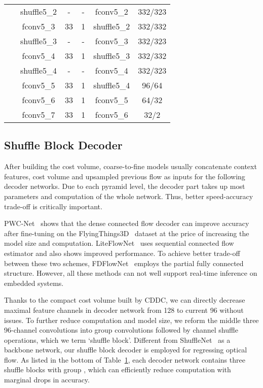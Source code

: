\documentclass[letterpaper, 10 pt, conference]{ieeeconf}
\begin{document}
\begin{table}[t]
{\begin{tabular}{ c|c|cc|c|c }
			~ & shuffle5\_2 & - & - & fconv5\_2 & 332/323 \\
			~ & fconv5\_3 & 33 & 1 & shuffle5\_2 & 332/332 \\
			~ & shuffle5\_3 & - & - & fconv5\_3 & 332/323 \\
			~ & fconv5\_4 & 33 & 1 & shuffle5\_3 & 332/332 \\
			~ & shuffle5\_4 & - & - & fconv5\_4 & 332/323 \\
			~ & fconv5\_5 & 33 & 1 & shuffle5\_4 & 96/64 \\
			~ & fconv5\_6 & 33 & 1 & fconv5\_5 & 64/32 \\
			~ & fconv5\_7 & 33 & 1 & fconv5\_6 & 32/2 \\
			\hline
	\end{tabular}}
	\label{tab1}
\end{table}






\subsection{Shuffle Block Decoder}
After building the cost volume, coarse-to-fine models usually concatenate context features, cost volume and upsampled previous flow as inputs for the following decoder networks. Due to 
each pyramid level, the decoder part takes up most parameters and computation of the whole network. Thus, better speed-accuracy trade-off is critically important.  

PWC-Net~\cite{Sun_2018_CVPR} shows that the dense connected flow decoder can improve accuracy after fine-tuning on the  FlyingThings3D~\cite{Mayer_2016} dataset at the price of increasing the model size and computation. LiteFlowNet~\cite{Hui_2018_CVPR} uses sequential connected flow estimator and also shows improved 
performance. To achieve better trade-off between these two schemes, 
FDFlowNet~\cite{Kong_2020} employs the partial fully connected structure. However, all these methods can not well support real-time inference on embedded systems.

Thanks to the compact cost volume built by CDDC, we can directly decrease maximal feature channels in decoder network from 128 to current 96 without issues. To further reduce computation and model size, we reform the middle three 96-channel convolutions into group convolutions followed by channel shuffle operations, which we term `shuffle block'. Different from ShuffleNet~\cite{8578814} as a backbone network, our shuffle block decoder is employed for regressing optical flow. As listed in the bottom of Table~\ref{tab1}, each decoder network contains three shuffle blocks with group , which 
can efficiently reduce computation with marginal drops in accuracy.
\end{document}
